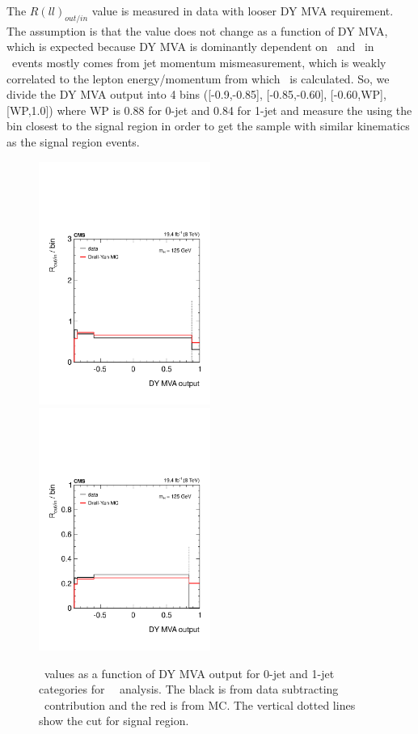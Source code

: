 The $R(ll)_{out/in}$ value is measured in data with looser DY MVA requirement. 
The assumption is that the \routin value does not change as a function of 
DY MVA, which is expected because DY MVA is dominantly dependent on \met\ 
and \met\ in \dyll\ events mostly comes from jet momentum mismeasurement, 
which is weakly correlated to the lepton energy/momentum from which 
\mll\ is calculated. So, we divide the DY MVA output into 4 bins
([-0.9,-0.85], [-0.85,-0.60], [-0.60,WP], [WP,1.0]) where WP 
is 0.88 for 0-jet and 0.84 for 1-jet and measure the 
\routin using the bin closest to the signal region in order to get the 
sample with similar kinematics as the signal region events.  
\begin{figure}[ht!] 
\centering 
\includegraphics[width=0.5\textwidth]{figures/Routin_0Jet_mH125_19467pb_dy.pdf} 
\includegraphics[width=0.5\textwidth]{figures/Routin_1Jet_mH125_19467pb_dy.pdf} 
\caption{\routin\ values as a function of DY MVA output for 0-jet and 1-jet categories
for \mHi=125~\GeV\ analysis. 
The black is from data subtracting \vv\ contribution and the red is from MC. 
The vertical dotted lines show the cut for signal region.} 
\label{fig:routin_mh125} 
\end{figure} 

